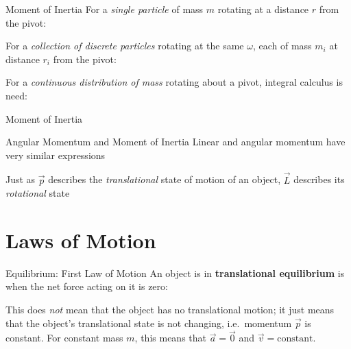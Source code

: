 \documentclass[12pt,compress,aspectratio=169]{beamer}
\begin{document}
\begin{frame}{Moment of Inertia}
  For a \emph{single particle} of mass $m$ rotating at a distance $r$ from the
  pivot:
  

  \vspace{-.1in}For a \emph{collection of discrete particles} rotating at the
  same $\omega$, each of mass $m_i$ at distance $r_i$ from the pivot:


  For a \emph{continuous distribution of mass} rotating about a pivot, integral
  calculus is need:

\end{frame}



\begin{frame}{Moment of Inertia}
  \centering
\end{frame}



\begin{frame}{Angular Momentum and Moment of Inertia}
  Linear and angular momentum have very similar expressions
    
  \vspace{-.3in}{\large
    \begin{align*}
      \vec p &= m\vec v\\
      \vec L &= I\vec\omega
    \end{align*}
  }
  
  Just as $\vec p$ describes the \emph{translational} state of motion of an
  object, $\vec L$ describes its \emph{rotational} state
\end{frame}



\section{Laws of Motion}

\begin{frame}{Equilibrium: First Law of Motion}
  An object is in \textbf{translational equilibrium} is when the net force
  acting on it is zero:
  

  This does \emph{not} mean that the object has no translational motion; it
  just means that the object's translational state is not changing, i.e.\
  momentum $\vec p$ is constant. For constant mass $m$, this means that
  $\vec a=\vec 0$ and $\vec v=\text{constant}$.
\end{frame}
\end{document}
